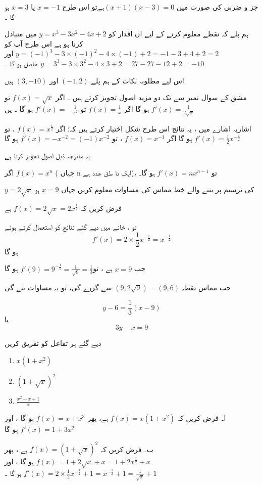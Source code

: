 جز و ضربی کی صورت میں 
\((x+1)(x-3)=0\)ہےتو اس طرح \(x=-1\) یا \(x=3\) ہو گا ۔

ہم پلے کہ نقطے معلوم کرنے کے لیے ان اقدار کو \(y=x^3 -3x^2 -4x +2\) میں متبادل کرنا ہو ہے 
اس طرح آپ کو \(y=(-1)^{3} -3 \times (-1)^{2} -4 \times (-1) +2=-1-3+4+2=2 \) اور \(y=3^3 -3 \times 3^2 -4 \times 3+2 =27 -27 -12 +2 =-10\) حاصل ہو گا ۔ 

اس لیے مطلوبہ نکات کے ہم پلے \((-1,2)\) اور \((3,-10)\) ہیں 

مشق  کے سوال نمبر سے  تک دو مزید اصول تجویز کرتے ہیں ۔
اگر \(f(x) = \sqrt{x}\) تو \(f'(x) = \frac{1}{2 \sqrt{x}}\) ہو گا 
اگر \(f(x) = \frac{1}{x}\) تو \(f'(x) = - \frac{1}{x^2}\) ہو گا ۔ 
یں

اشاریہ اشارے میں ، یہ نتائج اس طرح شکل اختیار کرتے ہیں  کہ؛
اگر \(f(x) =x^{\frac{1}{2}}\) ، تو \(f'(x)= \frac{1}{2} x^{- \frac{1}{2}}\) ہو گا
اگر \(f(x)=x^{-1}\) ، تو \(f'(x)=-x^{-2} = (-1)x^{-2}\) ہو گا

یہ مندرجہ ذیل اصول تجویز کرتا ہے 

اگر \(f(x)=x^n\) ( جہاں n  ایک نا طق عدد ہے)، تو  \( f'(x) =nx^{n-1}\) ہو گا۔ 


 \(y=2\sqrt{x}\)  کی ترسیم پر بننے والے خط مماس کی مساوات معلوم کریں جہاں \(x=9\) ہو

فرض کریں کہ \(f(x)=2\sqrt{x}=2x^{\frac{1}{2}}\) ہے 

تو ، خانے میں دیے گئے نتائج کو استعمال کرتے ہوئے   \[f'(x) = 2 \times \frac{1}{2} x^{-\frac{1}{2}}= x^{-\frac{1}{2}}\] ہو گا

 جب \(x=9\) ہے ، تو\(  f'(9) =9^{-\frac{1}{2}}=\frac{1}{\sqrt{9}} = \frac{1}{3}\) ہو گا

جب مماس نقطہ \((9,2\sqrt{9})=(9,6)\) سے گزرے گی، تو یہ مساوات  بنے گی 

\[y-6=\frac{1}{3}(x-9)\]  یا  \[3y-x=9\]



دیے گئے ہر تفاعل کو تفریق کریں 
\begin{enumerate}[.a]
\item \(x(1+x^2)\)
\item \((1+\sqrt{x})^2\)
\item \(\frac{x^2+x+1}{x}\)
\end{enumerate}

ا۔   فرض کریں کہ   \(f(x)=x(1+x^2)\) ہے،
پھر \(f(x)=x+x^3\) ہو گا ، اور \(f'(x)= 1+3x^2\) ہو گا

ب۔ فرض کریں کہ  \(f(x)=(1+\sqrt{x})^2\) ہے ،
پھر \(f(x)=1+2\sqrt{x} +x=1+2x^{\frac{1}{2}} +x \) ہو گا ، اور \(f'(x)=2 \times \frac{1}{2} x^{-\frac{1}{2}}+1=x^{-\frac{1}{2}}+1=\frac{1}{\sqrt{x}}+1\) ہو گا ۔
 
